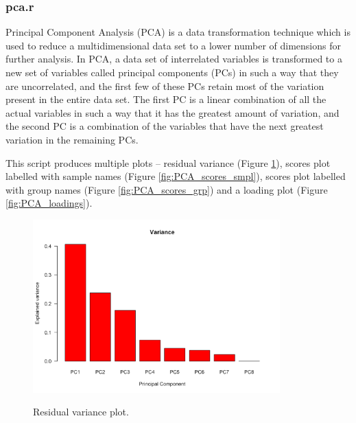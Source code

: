 \documentclass[english,a4paper,12pt]{article}
\begin{document}
\subsubsection*{pca.r}
Principal Component Analysis (PCA) is a data transformation technique which is used to reduce a multidimensional data set to a lower number of dimensions for further analysis. In PCA, a data set of interrelated variables is transformed to a new set of variables called principal components (PCs) in such a way that they are uncorrelated, and the first few of these PCs retain most of the variation present in the entire data set. The first PC is a linear combination of all the actual variables in such a way that it has the greatest amount of variation, and the second PC is a combination of the variables that have the next greatest variation in the remaining PCs.

This script produces multiple plots -- residual variance (Figure \ref{fig:PCA_variance}), scores plot labelled with sample names (Figure \ref{fig:PCA_scores_smpl}), scores plot labelled with group names (Figure \ref{fig:PCA_scores_grp}) and a loading plot (Figure \ref{fig:PCA_loadings}).

\begin{figure}[p]
\centering
\includegraphics[width=0.85\textwidth]{images/PCA_variance.png} \\
\caption[PCA - Variance]{Residual variance plot.}
\label{fig:PCA_variance}
\end{figure}
\end{document}
